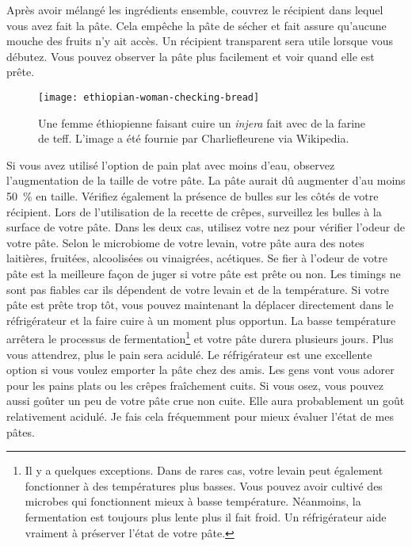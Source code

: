 Après avoir mélangé les ingrédients ensemble, couvrez le récipient dans lequel
vous avez fait la pâte. Cela empêche la pâte de sécher et fait
assure qu'aucune mouche des fruits n'y ait accès. Un récipient transparent sera utile
lorsque vous débutez. Vous pouvez observer la pâte plus facilement et voir quand
elle est prête.

\begin{figure}[htb!]
\begin{center}
  \texttt{[image: ethiopian-woman-checking-bread]}
  \caption[Injera éthiopien]{Une femme éthiopienne faisant cuire un \emph{injera}
      fait avec de la farine de teff.  L'image a été fournie par Charliefleurene
      via Wikipedia.}
\end{center}
\end{figure}Si vous avez utilisé l'option de pain plat avec moins d'eau, observez l'augmentation de la taille de votre pâte. La pâte aurait dû augmenter d'au moins \qty{50}{\percent} en taille.
Vérifiez également la présence de bulles sur les côtés de votre récipient.
Lors de l'utilisation de la recette de crêpes, surveillez les bulles à la surface de votre pâte.
Dans les deux cas, utilisez votre nez pour vérifier l'odeur de votre pâte. Selon 
le microbiome de votre levain, votre pâte aura des notes laitières, fruitées, alcoolisées ou vinaigrées, acétiques. Se fier à l'odeur de votre pâte est la meilleure façon de juger si votre pâte est prête ou non. Les timings ne sont pas fiables car ils dépendent de votre levain et de la température. Si votre pâte est prête trop tôt, vous pouvez maintenant la déplacer directement dans le réfrigérateur et la faire cuire à un moment plus opportun. La basse température arrêtera le processus de fermentation\footnote{Il y a quelques exceptions. Dans de rares cas, votre levain peut également fonctionner à des températures plus basses. Vous pouvez avoir cultivé des microbes qui fonctionnent mieux à basse température. Néanmoins, la fermentation est toujours plus lente plus il fait froid. Un réfrigérateur aide vraiment à préserver l'état de votre pâte.} et votre pâte durera plusieurs jours. Plus vous attendrez, plus le pain sera acidulé. Le réfrigérateur est une excellente option si vous voulez emporter la pâte chez des amis. Les gens vont vous adorer pour les pains plats ou les crêpes fraîchement cuits. Si vous osez, vous pouvez aussi goûter un peu de votre pâte crue non cuite. Elle aura probablement un goût relativement acidulé. Je fais cela fréquemment pour mieux évaluer l'état de mes pâtes.


